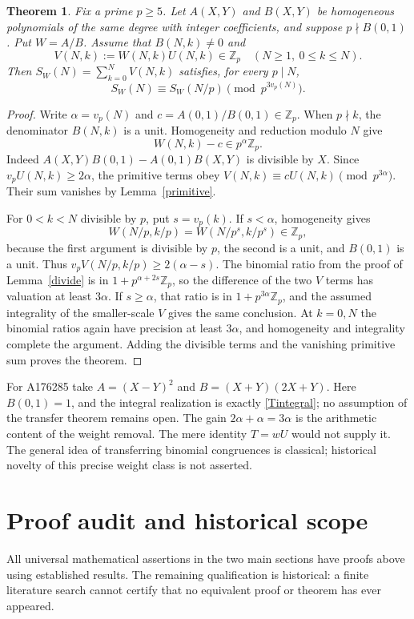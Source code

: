 \documentclass[11pt,a4paper]{article}
\newtheorem{theorem}{Theorem}[section]
\numberwithin{equation}{section}
\begin{document}
\begin{theorem}\label{thm:general-weight}
Fix a prime $p\ge5$. Let $A(X,Y)$ and $B(X,Y)$ be homogeneous
polynomials of the same degree with integer coefficients, and suppose
$p\nmid B(0,1)$. Put $W=A/B$. Assume that $B(N,k)\ne0$ and
\[
 V(N,k):=W(N,k)U(N,k)\in\mathbb Z_p
 \quad(N\ge1,\ 0\le k\le N).
\]
Then $S_W(N)=\sum_{k=0}^N V(N,k)$ satisfies, for every $p\mid N$,
\[
 S_W(N)\equiv S_W(N/p)\pmod{p^{3v_p(N)}}.
\]
\end{theorem}
\begin{proof}
Write $\alpha=v_p(N)$ and $c=A(0,1)/B(0,1)\in\mathbb Z_p$.
When $p\nmid k$, the denominator $B(N,k)$ is a unit. Homogeneity
and reduction modulo $N$ give
\[
 W(N,k)-c\in p^\alpha\mathbb Z_p.
\]
Indeed $A(X,Y)B(0,1)-A(0,1)B(X,Y)$ is divisible by $X$.
Since $v_pU(N,k)\ge2\alpha$, the primitive terms obey
$V(N,k)\equiv cU(N,k)\pmod{p^{3\alpha}}$. Their sum vanishes
by Lemma~\ref{primitive}.

For $0<k<N$ divisible by $p$, put $s=v_p(k)$. If $s<\alpha$,
homogeneity gives
\[
 W(N/p,k/p)=W(N/p^s,k/p^s)\in\mathbb Z_p,
\]
because the first argument is divisible by $p$, the second is a unit,
and $B(0,1)$ is a unit. Thus
$v_p V(N/p,k/p)\ge2(\alpha-s)$. The binomial ratio from the
proof of Lemma~\ref{divide} is in
$1+p^{\alpha+2s}\mathbb Z_p$, so the difference of the two
$V$ terms has valuation at least $3\alpha$.
If $s\ge\alpha$, that ratio is in $1+p^{3\alpha}\mathbb Z_p$,
and the assumed integrality of the smaller-scale $V$ gives the same
conclusion. At $k=0,N$ the binomial ratios again have precision at
least $3\alpha$, and homogeneity and integrality complete the argument.
Adding the divisible terms and the vanishing primitive sum proves
the theorem.
\end{proof}

For A176285 take $A=(X-Y)^2$ and $B=(X+Y)(2X+Y)$. Here
$B(0,1)=1$, and the integral realization is exactly
\eqref{Tintegral}; no assumption of the transfer theorem remains open.
The gain $2\alpha+\alpha=3\alpha$ is the arithmetic content of the
weight removal. The mere identity $T=wU$ would not supply it.
The general idea of transferring binomial congruences is classical;
historical novelty of this precise weight class is not asserted.


\section{Proof audit and historical scope}\label{sec:audit}
All universal mathematical assertions in the two main sections have
proofs above using established results. The remaining qualification is
historical: a finite literature search cannot certify that no equivalent
proof or theorem has ever appeared.
\end{document}
